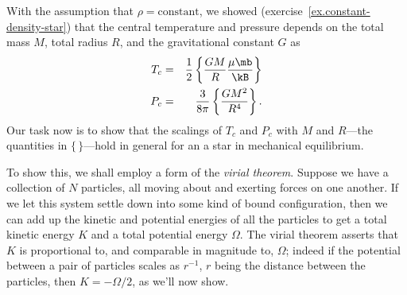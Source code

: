 With the assumption that $\rho = \textrm{constant}$, we showed (exercise~\ref{ex.constant-density-star}) that the central temperature and pressure depends on the total mass $M$, total radius $R$, and the gravitational constant $G$ as
\begin{eqnarray}
\label{e.Tc}
T_{c} &=& \frac{1}{2}\left\{\frac{GM}{R}\frac{\mu\mb}{\kB}\right\}\\
\label{e.Pc}
P_{c} &=& \frac{3}{8\pi}\left\{\frac{GM^{2}}{R^{4}}\right\}.
\end{eqnarray}
Our task now is to show that the scalings of $T_{c}$ and $P_{c}$ with $M$ and $R$---the quantities in $\{\,\}$---hold in general for an a star in mechanical equilibrium.

To show this, we shall employ a form of the \emph{virial theorem}. Suppose we have a collection of $N$ particles, all moving about and exerting forces on one another. If we let this system settle down into some kind of bound configuration, then we can add up the kinetic and potential energies of all the particles to get a total kinetic energy $K$ and a total potential energy $\Omega$. The virial theorem asserts that $K$ is proportional to, and comparable in magnitude to, $\Omega$; indeed if the potential between a pair of particles scales as $r^{-1}$, $r$ being the distance between the particles, then $K = -\Omega/2$, as we'll now show.

